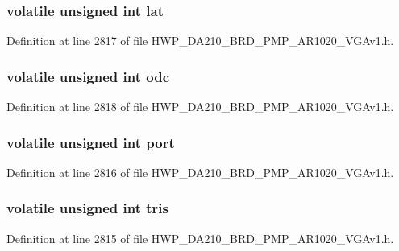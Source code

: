 \subsubsection[{lat}]{\setlength{\rightskip}{0pt plus 5cm}volatile unsigned int lat}\label{struct_port_reg_map_a695d2ece0857aa46158d751c92a448f8}


Definition at line 2817 of file H\+W\+P\+\_\+\+D\+A210\+\_\+\+B\+R\+D\+\_\+P\+M\+P\+\_\+\+A\+R1020\+\_\+\+V\+G\+Av1.\+h.

\hypertarget{struct_port_reg_map_a12ad4a7bff9ecc1acfed271243e85f0e}{}
\subsubsection[{odc}]{\setlength{\rightskip}{0pt plus 5cm}volatile unsigned int odc}\label{struct_port_reg_map_a12ad4a7bff9ecc1acfed271243e85f0e}


Definition at line 2818 of file H\+W\+P\+\_\+\+D\+A210\+\_\+\+B\+R\+D\+\_\+P\+M\+P\+\_\+\+A\+R1020\+\_\+\+V\+G\+Av1.\+h.

\hypertarget{struct_port_reg_map_ab72ef631d5fe7b039eb35a4b52b70c9d}{}
\subsubsection[{port}]{\setlength{\rightskip}{0pt plus 5cm}volatile unsigned int port}\label{struct_port_reg_map_ab72ef631d5fe7b039eb35a4b52b70c9d}


Definition at line 2816 of file H\+W\+P\+\_\+\+D\+A210\+\_\+\+B\+R\+D\+\_\+P\+M\+P\+\_\+\+A\+R1020\+\_\+\+V\+G\+Av1.\+h.

\hypertarget{struct_port_reg_map_ae1fc73dfc650aefda7cdb5bd6d85f54f}{}
\subsubsection[{tris}]{\setlength{\rightskip}{0pt plus 5cm}volatile unsigned int tris}\label{struct_port_reg_map_ae1fc73dfc650aefda7cdb5bd6d85f54f}


Definition at line 2815 of file H\+W\+P\+\_\+\+D\+A210\+\_\+\+B\+R\+D\+\_\+P\+M\+P\+\_\+\+A\+R1020\+\_\+\+V\+G\+Av1.\+h.



